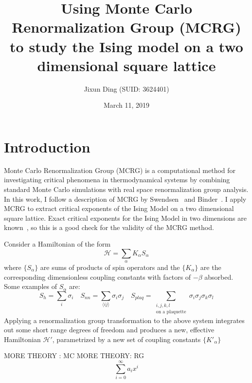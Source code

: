 \documentclass{article}
\title{Using Monte Carlo Renormalization Group (MCRG) to study the Ising model on a two dimensional square lattice}
\author{Jixun Ding (SUID: 3624401)}
\date{March 11, 2019}
\begin{document}
\maketitle
\section{Introduction}
Monte Carlo Renormalization Group (MCRG) is a computational method for investigating critical phenomena in thermodynamical systems by combining
standard Monte Carlo simulations with real space renormalization
group analysis. In this work, I follow a description of MCRG by Swendsen~\cite{SwendsenDetail} and Binder~\cite{Binder2014}. I apply MCRG to extract critical exponents of the Ising Model on a two dimensional square lattice. Exact critical exponents for the Ising Model in two dimensions are known~\cite{Onsager1944}, so this is a good check for the validity of the MCRG method.

Consider a Hamiltonian of the form
\begin{equation}
\mathcal{H} = \sum_{\alpha} K_\alpha S_\alpha
\end{equation}
where $\{S_\alpha\}$ are sums of products of spin operators and the $\{K_\alpha\}$ are the corresponding dimensionless coupling constants with factors of $-\beta$ absorbed. Some examples of $S_\alpha$ are:
\begin{equation*}
S_{h} = \sum_{i} \sigma_i \quad S_{nn} = \sum_{\langle ij \rangle} \sigma_i\sigma_j \quad S_{plaq} = \sum_{\substack{i,j,k,l\\ \text{on a plaquette}} } \sigma_i\sigma_j\sigma_k\sigma_l
\end{equation*}
Applying a renormalization group transformation to the above system integrates out some short range degrees of freedom and produces a new, effective Hamiltonian $\mathcal{H'}$, parametrized by a new set of coupling constants $\{K'_\alpha\}$

MORE THEORY : MC
MORE THEORY: RG
\begin{equation} 
\sum_{i=0}^{\infty} a_i x^i \label{LinRGMat}
\end{equation}
\end{document}
